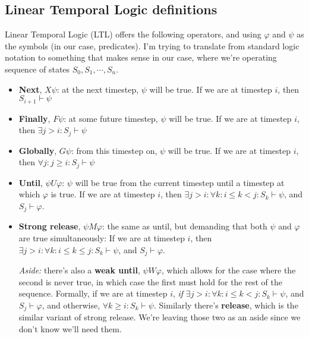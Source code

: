 \documentclass{article}
\begin{document}
\subsection{Linear Temporal Logic definitions}
Linear Temporal Logic (LTL) offers the following operators, and using $\varphi$ and $\psi$ as the symbols (in our case, predicates). 
I'm trying to translate from standard logic notation to something that makes sense in our case, where we're operating sequence of states $S_0, S_1, \cdots, S_n$. 
\begin{itemize}
    \item \textbf{Next}, $X \psi$: at the next timestep, $\psi$ will be true. If we are at timestep $i$, then $S_{i+1} \vdash \psi$
    
    \item \textbf{Finally}, $F \psi$: at some future timestep, $\psi$ will be true. If we are at timestep $i$, then $\exists j > i:  S_{j} \vdash \psi$
    
    \item \textbf{Globally}, $G \psi$: from this timestep on, $\psi$ will be true. If we are at timestep $i$, then $\forall j: j \geq i: S_{j} \vdash \psi$
    
    \item \textbf{Until}, $\psi U \varphi$: $\psi$ will be true from the current timestep until a timestep at which $\varphi$ is true. If we are at timestep $i$, then $\exists j > i: \forall k: i \leq k < j: S_k \vdash \psi$, and $S_j \vdash \varphi$.
    \item \textbf{Strong release}, $\psi M \varphi$: the same as until, but demanding that both $\psi$ and $\varphi$ are true simultaneously: If we are at timestep $i$, then $\exists j > i: \forall k: i \leq k \leq j: S_k \vdash \psi$, and $S_j \vdash \varphi$. 
    
    \textit{Aside:} there's also a \textbf{weak until}, $\psi W \varphi$, which allows for the case where the second is never true, in which case the first must hold for the rest of the sequence. Formally, if we are at timestep $i$, \textit{if} $\exists j > i: \forall k: i \leq k < j: S_k \vdash \psi$, and $S_j \vdash \varphi$, and otherwise, $\forall k \geq i: S_k \vdash \psi$. Similarly there's \textbf{release}, which is the similar variant of strong release. We're leaving those two as an aside since we don't know we'll need them. 
    
\end{itemize}
\end{document}
